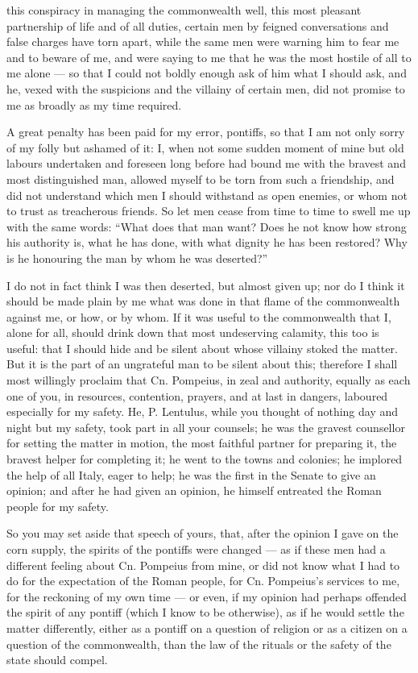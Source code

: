  this conspiracy in managing the commonwealth well, this most pleasant partnership of life and of all duties, certain men by feigned conversations and false charges have torn apart, while the same men were warning him to fear me and to beware of me, and were saying to me that he was the most hostile of all to me alone --- so that I could not boldly enough ask of him what I should ask, and he, vexed with the suspicions and the villainy of certain men, did not promise to me as broadly as my time required.

 A great penalty has been paid for my error, pontiffs, so that I am not only sorry of my folly but ashamed of it: I, when not some sudden moment of mine but old labours undertaken and foreseen long before had bound me with the bravest and most distinguished man, allowed myself to be torn from such a friendship, and did not understand which men I should withstand as open enemies, or whom not to trust as treacherous friends. So let men cease from time to time to swell me up with the same words: ``What does that man want? Does he not know how strong his authority is, what he has done, with what dignity he has been restored? Why is he honouring the man by whom he was deserted?''

 I do not in fact think I was then deserted, but almost given up; nor do I think it should be made plain by me what was done in that flame of the commonwealth against me, or how, or by whom. If it was useful to the commonwealth that I, alone for all, should drink down that most undeserving calamity, this too is useful: that I should hide and be silent about whose villainy stoked the matter. But it is the part of an ungrateful man to be silent about this; therefore I shall most willingly proclaim that Cn. Pompeius, in zeal and authority, equally as each one of you, in resources, contention, prayers, and at last in dangers, laboured especially for my safety. He, P. Lentulus, while you thought of nothing day and night but my safety, took part in all your counsels; he was the gravest counsellor for setting the matter in motion, the most faithful partner for preparing it, the bravest helper for completing it; he went to the towns and colonies; he implored the help of all Italy, eager to help; he was the first in the Senate to give an opinion; and after he had given an opinion, he himself entreated the Roman people for my safety.

 So you may set aside that speech of yours, that, after the opinion I gave on the corn supply, the spirits of the pontiffs were changed --- as if these men had a different feeling about Cn. Pompeius from mine, or did not know what I had to do for the expectation of the Roman people, for Cn. Pompeius's services to me, for the reckoning of my own time --- or even, if my opinion had perhaps offended the spirit of any pontiff (which I know to be otherwise), as if he would settle the matter differently, either as a pontiff on a question of religion or as a citizen on a question of the commonwealth, than the law of the rituals or the safety of the state should compel.

